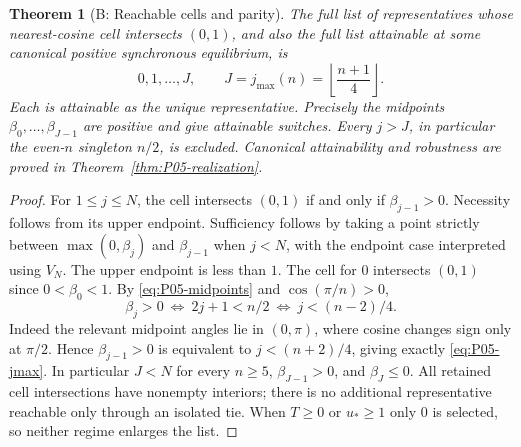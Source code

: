 \documentclass[11pt]{article}
\newtheorem{theorem}{Theorem}[section]
\theoremstyle{definition}
\theoremstyle{remark}
\begin{document}
\begin{theorem}[B: Reachable cells and parity]
\label{thm:P05-reachable}
The full list of representatives whose nearest-cosine cell intersects
$(0,1)$, and also the full list attainable at some canonical positive
synchronous equilibrium, is
\begin{equation}
 \boxed{0,1,\ldots,J,\qquad J=j_{\max}(n)=\left\lfloor\frac{n+1}{4}\right\rfloor.}
 \label{eq:P05-jmax}
\end{equation}
Each is attainable as the unique representative. Precisely the midpoints
$\beta_0,\ldots,\beta_{J-1}$ are positive and give attainable switches.
Every $j>J$, in particular the even-$n$ singleton $n/2$, is excluded.
Canonical attainability and robustness are proved in Theorem~\ref{thm:P05-realization}.
\end{theorem}
\begin{proof}
For $1\le j\le N$, the cell intersects $(0,1)$ if and only if
$\beta_{j-1}>0$. Necessity follows from its upper endpoint. Sufficiency
follows by taking a point strictly between
$\max(0,\beta_j)$ and $\beta_{j-1}$ when $j<N$, with the endpoint
case interpreted using $V_N$. The upper endpoint is less than $1$.
The cell for $0$ intersects $(0,1)$ since $0<\beta_0<1$.
By \eqref{eq:P05-midpoints} and $\cos(\pi/n)>0$,
\[
 \beta_j>0\ \Longleftrightarrow\ 2j+1<n/2
 \ \Longleftrightarrow\ j<(n-2)/4.
\]
Indeed the relevant midpoint angles lie in $(0,\pi)$, where cosine
changes sign only at $\pi/2$. Hence
$\beta_{j-1}>0$ is equivalent to $j<(n+2)/4$, giving exactly
\eqref{eq:P05-jmax}. In particular $J<N$ for every $n\ge5$,
$\beta_{J-1}>0$, and $\beta_J\le0$. All retained cell intersections
have nonempty interiors; there is no additional representative reachable
only through an isolated tie. When $T\ge0$ or $u_*\ge1$ only $0$
is selected, so neither regime enlarges the list.
\end{proof}
\end{document}
